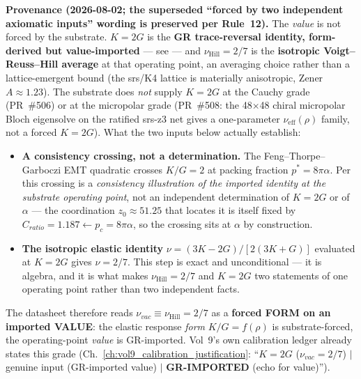 \noindent\textbf{Provenance (2026-08-02; the superseded ``forced by two independent axiomatic inputs'' wording is preserved per Rule~12).} The \emph{value} is not forced by the substrate. $K = 2G$ is the \textbf{GR trace-reversal identity, form-derived but value-imported} --- see  --- and $\nu_{\mathrm{Hill}} = 2/7$ is the \textbf{isotropic Voigt--Reuss--Hill average} at that operating point, an averaging choice rather than a lattice-emergent bound (the srs/K4 lattice is materially anisotropic, Zener $A \approx 1.23$). The substrate does \emph{not} supply $K = 2G$ at the Cauchy grade (PR~\#506) or at the micropolar grade (PR~\#508: the 48$\times$48 chiral micropolar Bloch eigensolve on the ratified srs-z3 net gives a one-parameter $\nu_{\mathrm{eff}}(\rho)$ family, not a forced $K = 2G$). What the two inputs below actually establish:

\begin{itemize}
    \item \textbf{A consistency crossing, not a determination.} The Feng--Thorpe--Garboczi EMT quadratic crosses $K/G = 2$ at packing fraction $p^* = 8\pi\alpha$. Per  this crossing is a \emph{consistency illustration of the imported identity at the substrate operating point}, not an independent determination of $K = 2G$ or of $\alpha$ --- the coordination $z_0 \approx 51.25$ that locates it is itself fixed by $C_{ratio} = 1.187 \leftarrow p_c = 8\pi\alpha$, so the crossing sits at $\alpha$ by construction.
    \item \textbf{The isotropic elastic identity} $\nu = (3K - 2G)/[2(3K + G)]$ evaluated at $K = 2G$ gives $\nu = 2/7$. This step is exact and unconditional --- it is algebra, and it is what makes $\nu_{\mathrm{Hill}} = 2/7$ and $K = 2G$ two statements of one operating point rather than two independent facts.
\end{itemize}

\noindent The datasheet therefore reads $\nu_{vac} \equiv \nu_{\mathrm{Hill}} = 2/7$ as a \textbf{forced FORM on an imported VALUE}: the elastic response \emph{form} $K/G = f(\rho)$ is substrate-forced, the operating-point \emph{value} is GR-imported. Vol~9's own calibration ledger already states this grade (Ch.~\ref{ch:vol9_calibration_justification}: ``$K = 2G$ ($\nu_{vac} = 2/7$) $\mid$ genuine input (GR-imported value) $\mid$ \textbf{GR-IMPORTED} (echo for value)'').

